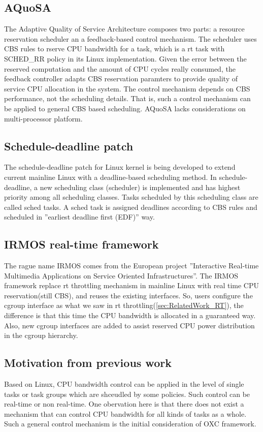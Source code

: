 \subsection{AQuoSA\label{sec:AQuoSA}}
The Adaptive Quality of Service Architecture composes two parts: 
a resource reservation scheduler an a feedback-based
control mechanism. The scheduler uses CBS rules to rserve CPU bandwidth for
a task, which is a rt task with SCHED\_RR policy in its Linux implementation.
Given the error between the reserved computation and the amount of CPU cycles
really consumed, the feedback controller adapts CBS reservation paramters to
provide quality of service CPU allocation in the system.
The control mechanism depends on CBS performance, not the scheduling details.
That is, such a control mechanism can be applied to general CBS based 
scheduling. AQuoSA lacks considerations on multi-processor platform.
  
\subsection{Schedule-deadline patch}
The schedule-deadline patch for Linux kernel is being developed to extend
current mainline Linux with a deadline-based scheduling method. 
In schedule-deadline, a new scheduling class (scheduler) is implemented and 
has highest priority among all scheduling classes. Tasks scheduled by this
scheduling class are called sched tasks. A sched task is assigned deadlines
according to CBS rules and scheduled in ''earliest deadline first (EDF)'' way.
\subsection{IRMOS real-time framework}
The rague name IRMOS comes from the European project ''Interactive Real-time
Multimedia Applications on Service Oriented Infrastructures''. 
The IRMOS 
framework replace rt throttling mechanism in mainline Linux with real time
CPU reservation(still CBS), and reuses the existing interfaces. So, users 
configure the cgroup interface as what we saw in rt 
throttling(\ref{sec:RelatedWork_RT}), the difference is that this time the CPU 
bandwidth is allocated in a guaranteed way. Also, new cgroup interfaces are 
added to assist reserved CPU power distribution in the cgroup hierarchy.

\subsection{Motivation from previous work\label{sec:motivation}}
Based on Linux, CPU bandwidth control can be applied in the level of 
single tasks or task groups which are shceudled by some policies.
Such control can be real-time or non real-time. 
One obervation here is that there does not exist a mechanism that can 
control CPU bandwidth for all kinds of tasks as a whole. 
Such a general control mechanism is the initial consideration of 
OXC framework. 
